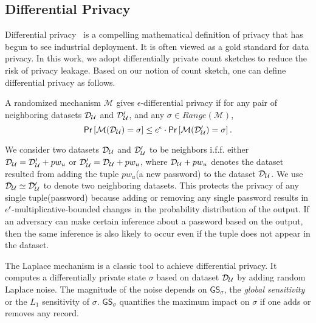 \subsection{Differential Privacy} \label{section:Prelinmaries-DiffernetialPrivacy}



Differential privacy~\cite{ECS:Dwork11} is a compelling mathematical definition of privacy that has begun to see industrial deployment\cite{CCS:ErlPihKor14,AppleDP,AppleDPTeam}. It is often viewed as a gold standard for data privacy.  In this work, we adopt differentially private count sketches to reduce the risk of privacy leakage. Based on our notion of count sketch, one can define differential privacy as follows.

\begin{definition} \label{def:diff}
	
	A randomized mechanism $\mathcal{M}$ gives $\epsilon$-differential privacy if for any pair of neighboring datasets $\mathcal{D}_{{\mathcal{U}}}$ and $\mathcal{D}_{{\mathcal{U}}}'$, and any $\sigma \in \mathit{Range}(\mathcal{M})$,
	\vspace{-0.2cm}
	$$\mathsf{Pr} \left[\mathcal{M}(\mathcal{D}_{{\mathcal{U}}})=\sigma\right]  \leq e^{\epsilon}\cdot \mathsf{Pr} \left[\mathcal{M}(\mathcal{D}_{{\mathcal{U}}}')=\sigma\right] .$$
	\vspace{-0.25cm}
\end{definition}


We consider two datasets $\mathcal{D}_{{\mathcal{U}}}$ and $\mathcal{D}_{{\mathcal{U}}}'$ to be neighbors i.f.f. either $\mathcal{D}_{{\mathcal{U}}}=\mathcal{D}_{{\mathcal{U}}}' + pw_u$ or $\mathcal{D}_{{\mathcal{U}}}'=\mathcal{D}_{{\mathcal{U}}} + pw_u$, where $\mathcal{D}_{{\mathcal{U}}} +pw_u$ denotes the dataset resulted from adding the tuple $pw_u$(a new password) to the dataset $\mathcal{D}_{{\mathcal{U}}}$. We use $\mathcal{D}_{{\mathcal{U}}}\simeq \mathcal{D}_{{\mathcal{U}}}'$ to denote two neighboring datasets. This protects the privacy of any single tuple(password) because adding or removing any single password results in $e^{\epsilon}$-multiplicative-bounded changes in the probability distribution of the output. If an adversary can make certain inference about a password based on the output, then the same inference is also likely to occur even if the tuple does not appear in the dataset.


The Laplace mechanism is a classic tool to achieve differential privacy. It computes a differentially private state $\sigma$ based on dataset $\mathcal{D}_{{\mathcal{U}}}$ by adding random Laplace noise. The magnitude of the noise depends on $\mathsf{GS}_\sigma$, the \emph{global sensitivity} or the $L_1$ sensitivity of $\sigma$.  $\mathsf{GS}_\sigma$ quantifies the maximum impact on $\sigma$ if one adds or removes any record. 


